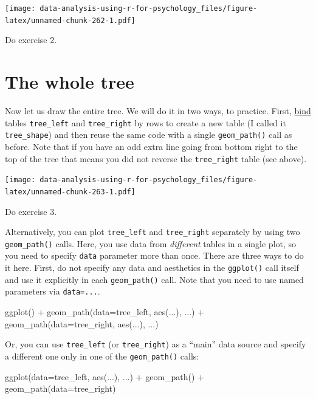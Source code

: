 \documentclass[
]{book}
\newenvironment{Shaded}{\begin{snugshade}}{\end{snugshade}}
\newcommand{\AttributeTok}[1]{\textcolor[rgb]{0.77,0.63,0.00}{#1}}
\newcommand{\FunctionTok}[1]{\textcolor[rgb]{0.00,0.00,0.00}{#1}}
\newcommand{\NormalTok}[1]{#1}
\newcommand{\SpecialCharTok}[1]{\textcolor[rgb]{0.00,0.00,0.00}{#1}}
\begin{document}
\texttt{[image: data-analysis-using-r-for-psychology\_files/figure-latex/unnamed-chunk-262-1.pdf]}

Do exercise 2.

\hypertarget{the-whole-tree}{%
\section{The whole tree}\label{the-whole-tree}}

Now let us draw the entire tree. We will do it in two ways, to practice. First, \href{https://dplyr.tidyverse.org/reference/bind.html}{bind} tables \texttt{tree\_left} and \texttt{tree\_right} by rows to create a new table (I called it \texttt{tree\_shape}) and then reuse the same code with a single \texttt{geom\_path()} call as before. Note that if you have an odd extra line going from bottom right to the top of the tree that means you did not reverse the \texttt{tree\_right} table (see above).

\texttt{[image: data-analysis-using-r-for-psychology\_files/figure-latex/unnamed-chunk-263-1.pdf]}

Do exercise 3.

Alternatively, you can plot \texttt{tree\_left} and \texttt{tree\_right} separately by using two \texttt{geom\_path()} calls. Here, you use data from \emph{different} tables in a single plot, so you need to specify \texttt{data} parameter more than once. There are three ways to do it here. First, do not specify any data and aesthetics in the \texttt{ggplot()} call itself and use it explicitly in each \texttt{geom\_path()} call. Note that you need to use named parameters via \texttt{data=...}.

\begin{Shaded}
\begin{Highlighting}[]
\FunctionTok{ggplot}\NormalTok{() }\SpecialCharTok{+} 
  \FunctionTok{geom\_path}\NormalTok{(}\AttributeTok{data=}\NormalTok{tree\_left, }\FunctionTok{aes}\NormalTok{(...), ...) }\SpecialCharTok{+}
  \FunctionTok{geom\_path}\NormalTok{(}\AttributeTok{data=}\NormalTok{tree\_right, }\FunctionTok{aes}\NormalTok{(...), ...)}
\end{Highlighting}
\end{Shaded}

Or, you can use \texttt{tree\_left} (or \texttt{tree\_right}) as a ``main'' data source and specify a different one only in one of the \texttt{geom\_path()} calls:

\begin{Shaded}
\begin{Highlighting}[]
\FunctionTok{ggplot}\NormalTok{(}\AttributeTok{data=}\NormalTok{tree\_left, }\FunctionTok{aes}\NormalTok{(...), ...) }\SpecialCharTok{+} 
  \FunctionTok{geom\_path}\NormalTok{() }\SpecialCharTok{+}
  \FunctionTok{geom\_path}\NormalTok{(}\AttributeTok{data=}\NormalTok{tree\_right)}
\end{Highlighting}
\end{Shaded}
\end{document}
